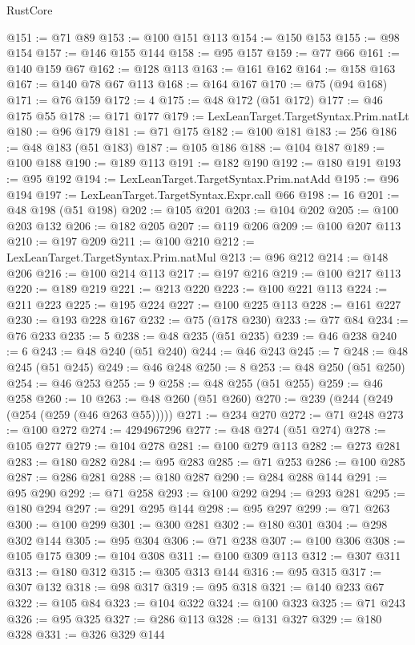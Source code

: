 \begin{lexlean}{RustCore}
\begin{coremodule}
@151 := @71 @89
@153 := @100 @151 @113
@154 := @150 @153
@155 := @98 @154
@157 := @146 @155 @144
@158 := @95 @157
@159 := @77 @66
@161 := @140 @159 @67
@162 := @128 @113
@163 := @161 @162
@164 := @158 @163
@167 := @140 @78 @67 @113
@168 := @164 @167
@170 := @75 (@94 @168)
@171 := @76 @159
@172 := 4
@175 := @48 @172 (@51 @172)
@177 := @46 @175 @55
@178 := @171 @177
@179 := LexLeanTarget.TargetSyntax.Prim.natLt
@180 := @96 @179
@181 := @71 @175
@182 := @100 @181
@183 := 256
@186 := @48 @183 (@51 @183)
@187 := @105 @186
@188 := @104 @187
@189 := @100 @188
@190 := @189 @113
@191 := @182 @190
@192 := @180 @191
@193 := @95 @192
@194 := LexLeanTarget.TargetSyntax.Prim.natAdd
@195 := @96 @194
@197 := LexLeanTarget.TargetSyntax.Expr.call @66
@198 := 16
@201 := @48 @198 (@51 @198)
@202 := @105 @201
@203 := @104 @202
@205 := @100 @203 @132
@206 := @182 @205
@207 := @119 @206
@209 := @100 @207 @113
@210 := @197 @209
@211 := @100 @210
@212 := LexLeanTarget.TargetSyntax.Prim.natMul
@213 := @96 @212
@214 := @148 @206
@216 := @100 @214 @113
@217 := @197 @216
@219 := @100 @217 @113
@220 := @189 @219
@221 := @213 @220
@223 := @100 @221 @113
@224 := @211 @223
@225 := @195 @224
@227 := @100 @225 @113
@228 := @161 @227
@230 := @193 @228 @167
@232 := @75 (@178 @230)
@233 := @77 @84
@234 := @76 @233
@235 := 5
@238 := @48 @235 (@51 @235)
@239 := @46 @238
@240 := 6
@243 := @48 @240 (@51 @240)
@244 := @46 @243
@245 := 7
@248 := @48 @245 (@51 @245)
@249 := @46 @248
@250 := 8
@253 := @48 @250 (@51 @250)
@254 := @46 @253
@255 := 9
@258 := @48 @255 (@51 @255)
@259 := @46 @258
@260 := 10
@263 := @48 @260 (@51 @260)
@270 := @239 (@244 (@249 (@254 (@259 (@46 @263 @55)))))
@271 := @234 @270
@272 := @71 @248
@273 := @100 @272
@274 := 4294967296
@277 := @48 @274 (@51 @274)
@278 := @105 @277
@279 := @104 @278
@281 := @100 @279 @113
@282 := @273 @281
@283 := @180 @282
@284 := @95 @283
@285 := @71 @253
@286 := @100 @285
@287 := @286 @281
@288 := @180 @287
@290 := @284 @288 @144
@291 := @95 @290
@292 := @71 @258
@293 := @100 @292
@294 := @293 @281
@295 := @180 @294
@297 := @291 @295 @144
@298 := @95 @297
@299 := @71 @263
@300 := @100 @299
@301 := @300 @281
@302 := @180 @301
@304 := @298 @302 @144
@305 := @95 @304
@306 := @71 @238
@307 := @100 @306
@308 := @105 @175
@309 := @104 @308
@311 := @100 @309 @113
@312 := @307 @311
@313 := @180 @312
@315 := @305 @313 @144
@316 := @95 @315
@317 := @307 @132
@318 := @98 @317
@319 := @95 @318
@321 := @140 @233 @67
@322 := @105 @84
@323 := @104 @322
@324 := @100 @323
@325 := @71 @243
@326 := @95 @325
@327 := @286 @113
@328 := @131 @327
@329 := @180 @328
@331 := @326 @329 @144

\end{coremodule}
\end{lexlean}
